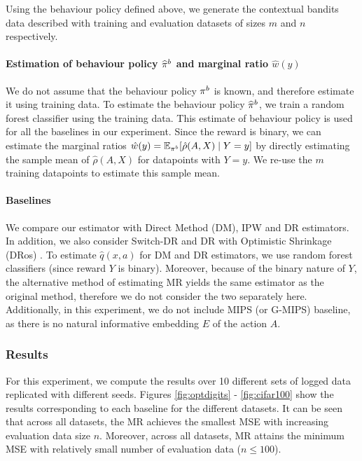 Using the behaviour policy defined above, we generate the contextual bandits data described with training and evaluation datasets of sizes $m$ and $n$ respectively.

\paragraph{Estimation of behaviour policy $\widehat{\pi}^b$ and marginal ratio $\hat{w}(y)$}
We do not assume that the behaviour policy $\pi^b$ is known, and therefore estimate it using training data. To estimate the behaviour policy $\widehat{\pi}^b$, we train a random forest classifier using the training data. This estimate of behaviour policy is used for all the baselines in our experiment. 
Since the reward is binary, we can estimate the marginal ratios $\hat{w}(y) = \mathbb{E}_{\pi^b}[\hat{\rho}(A, X)\mid Y=y]$ by directly estimating the sample mean of $\hat{\rho}(A, X)$ for datapoints with $Y=y$. We re-use the $m$ training datapoints to estimate this sample mean. 

\paragraph{Baselines}
We compare our estimator with Direct Method (DM), IPW and DR estimators. 
In addition, we also consider Switch-DR \citep{wang2017optimal} and DR with Optimistic Shrinkage (DRos) \citep{su2020doubly}.
To estimate $\hat{q}(x, a)$ for DM and DR estimators, we use random forest classifiers (since reward $Y$ is binary). Moreover, because of the binary nature of $Y$, the alternative method of estimating MR yields the same estimator as the original method, therefore we do not consider the two separately here. Additionally, in this experiment, we do not include MIPS (or G-MIPS) baseline, as there is no natural informative embedding $E$ of the action $A$. 

\subsubsection{Results}
For this experiment, we compute the results over 10 different sets of logged data replicated with different seeds.
Figures \ref{fig:optdigits} - \ref{fig:cifar100} show the results corresponding to each baseline for the different datasets. It can be seen that across all datasets, the MR achieves the smallest MSE with increasing evaluation data size $n$. Moreover, across all datasets, MR attains the minimum MSE with relatively small number of evaluation data ($n\leq 100$).

